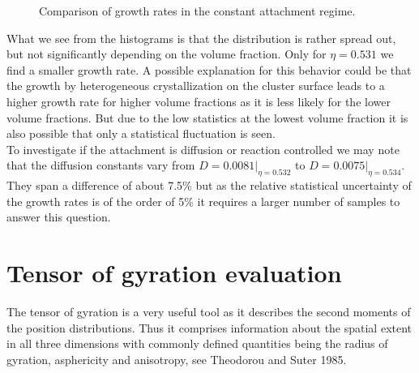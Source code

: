 \begin{figure}[h]
\begin{center}
 \hspace{0.5cm}
\caption[Constant attachment rate measurements from production data]{Comparison of growth rates in the constant attachment regime.}
\label{fig:constant_growth_rates}
\end{center}
\end{figure}

What we see from the histograms is that the distribution is rather spread out, but not significantly depending on the volume fraction. Only for $\eta = 0.531$ we find a smaller growth rate. A possible explanation for this behavior could be that the growth by heterogeneous crystallization on the cluster surface leads to a higher growth rate for higher volume fractions as it is less likely for the lower volume fractions. But due to the low statistics at the lowest volume fraction it is also possible that only a statistical fluctuation is seen.\\ 
To investigate if the attachment is diffusion or reaction controlled we may note that the diffusion constants vary from $D=0.0081|_{\eta = 0.532}$ to $D=0.0075|_{\eta = 0.534}$. They span a difference of about 7.5\% but as the relative statistical uncertainty of the growth rates is of the order of 5\% it requires a larger number of samples to answer this question.

\section{Tensor of gyration evaluation}
\label{sec:tog}
The tensor of gyration is a very useful tool as it describes the second moments of the position distributions. Thus it comprises information about the spatial extent in all three dimensions with commonly defined quantities being the radius of gyration, asphericity and anisotropy, see Theodorou and Suter 1985\cite{Theodorou1985}.\\

